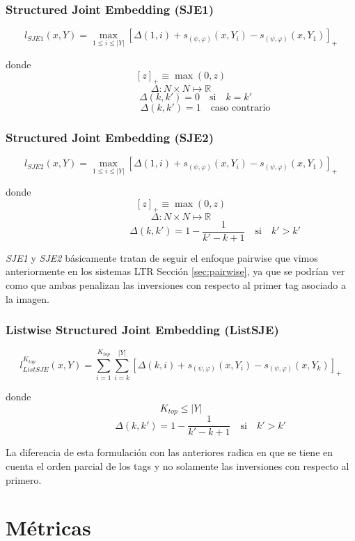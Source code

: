 \subsubsection{Structured Joint Embedding (SJE1)}

\[l_{SJE1}(x, Y) = \max_{1 \leqslant i  \leqslant |Y|} [\Delta(1, i) + s_{(\psi, \varphi)} (x, Y_{i}) - s_{(\psi, \varphi)}(x, Y_{1})]_{+}\]

donde
\[[z]_{+} \equiv \max(0, z)\]
\[\Delta: N \times N \mapsto \mathbb{R}\]
\[ \quad \quad \quad \Delta(k, k') = 0 \quad \textrm{si} \quad k=k'\]
\[\quad \quad \quad \quad \quad \Delta(k, k') = 1 \quad \textrm{caso contrario} \]

\subsubsection{Structured Joint Embedding (SJE2)}

\[l_{SJE2}(x, Y) = \max_{1 \leqslant i  \leqslant |Y|} [\Delta(1, i) + s_{(\psi, \varphi)} (x, Y_{i}) - s_{(\psi, \varphi)}(x, Y_{1})]_{+}\]

donde
\[[z]_{+} \equiv \max(0, z)\]
\[\Delta: N \times N \mapsto \mathbb{R}\]
\[\quad \quad \quad \quad \quad \quad \quad \Delta(k, k') = 1 - \frac{1}{k' - k + 1} \quad \textrm{si} \quad k' > k'\]


\textit{SJE1} y \textit{SJE2} básicamente tratan de seguir el enfoque pairwise que vimos anteriormente en los sistemas LTR Sección \ref{sec:pairwise}, ya que se podrían ver como que ambas penalizan las inversiones con respecto al primer tag asociado a la imagen.


\subsubsection{Listwise Structured Joint Embedding (ListSJE)} \label{sec:listsje}

\[l_{ListSJE}^{K_{top}}(x, Y) = \sum_{i=1}^{K_{top}} \sum_{i=k}^{|Y|} [\Delta(k, i) + s_{(\psi, \varphi)} (x, Y_{i}) - s_{(\psi, \varphi)}(x, Y_{k})]_{+}\]

donde
\[ K_{top} \leqslant |Y| \]
\[\quad \quad \quad \quad \Delta(k, k') = 1 - \frac{1}{k' - k + 1} \quad \textrm{si} \quad k' > k'\]

 La diferencia de esta formulación con las anteriores radica en que se tiene en cuenta el orden parcial de los tags y no solamente las inversiones con respecto al primero.


\section{Métricas}

